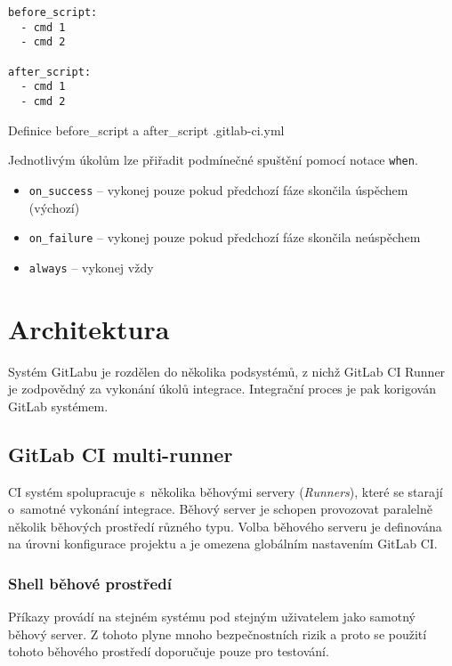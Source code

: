 \begin{listing}[ht]
\begin{verbatim}
before_script:
  - cmd 1
  - cmd 2

after_script:
  - cmd 1
  - cmd 2
\end{verbatim}
\caption{Definice before\_script a after\_script .gitlab-ci.yml}
\end{listing}

Jednotlivým úkolům lze přiřadit podmínečné spuštění pomocí notace \verb|when|.

\begin{itemize}
  \item \verb|on_success| -- vykonej pouze pokud předchozí fáze skončila úspěchem (výchozí) 
  \item \verb|on_failure| -- vykonej pouze pokud předchozí fáze skončila neúspěchem
  \item \verb|always| -- vykonej vždy
\end{itemize}

\section{Architektura}

Systém GitLabu je rozdělen do několika podsystémů, z nichž GitLab CI Runner je zodpovědný za vykonání úkolů integrace.
Integrační proces je pak korigován GitLab systémem.
\cite{gitlab_architecture}

\subsection{GitLab CI multi-runner}

CI systém spolupracuje s~několika běhovými servery (\textit{Runners}), které se starají o~samotné vykonání integrace.
Běhový server je schopen provozovat paralelně několik běhových prostředí různého typu.
Volba běhového serveru je definována na úrovni konfigurace projektu a je omezena globálním nastavením GitLab CI.


\subsubsection{Shell běhové prostředí}

Příkazy provádí na stejném systému pod stejným uživatelem jako samotný běhový server.
Z tohoto plyne mnoho bezpečnostních rizik a proto se použití tohoto běhového prostředí doporučuje pouze pro testování.

